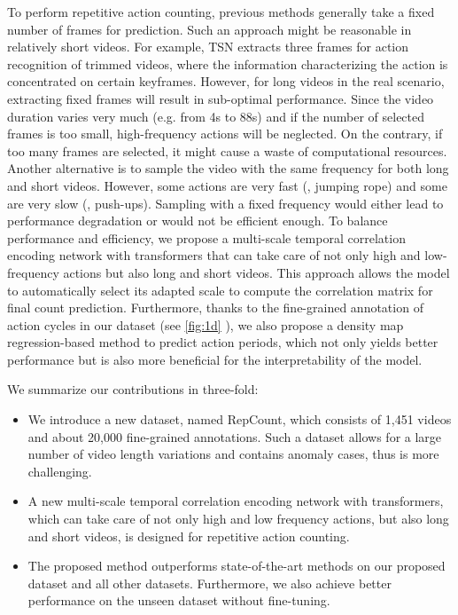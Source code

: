 \documentclass[10pt,twocolumn,letterpaper]{article}
\begin{document}
To perform repetitive action counting, previous methods \cite{RepNet} generally take a fixed number of frames for prediction. Such an approach might be reasonable in relatively short videos. For example, TSN \cite{TSN2016ECCV} extracts three frames for action recognition of trimmed videos, where the information characterizing the action is concentrated on certain keyframes. However, for long videos in the real scenario, extracting fixed frames will result in sub-optimal performance. Since the video duration varies very much (e.g. from 4s to 88s) and if the number of selected frames is too small, high-frequency actions will be neglected. On the contrary, if too many frames are selected, it might cause a waste of computational resources. Another alternative is to sample the video with the same frequency for both long and short videos. However, some actions are very fast (\eg, jumping rope) and some are very slow (\eg, push-ups). Sampling with a fixed frequency would either lead to performance degradation or would not be efficient enough. To balance performance and efficiency, we propose a multi-scale temporal correlation encoding network with transformers that can take care of not only high and low-frequency actions but also long and short videos. This approach allows the model to automatically select its adapted scale to compute the correlation matrix for final count prediction. Furthermore, thanks to the fine-grained annotation of action cycles in our dataset (see \cref{fig:1d} ), we also propose a density map regression-based method to predict action periods, which not only yields better performance but is also more beneficial for the interpretability of the model.

We summarize our contributions in three-fold:

\begin{itemize}[leftmargin=*]
\item We introduce a new dataset, named RepCount, which consists of 1,451 videos and about 20,000 fine-grained annotations. Such a dataset allows for a large number of video length variations and contains anomaly cases, thus is more challenging. 
\item A new multi-scale temporal correlation encoding network with transformers, which can take care of not only high and low frequency actions, but also long and short videos, is designed for repetitive action counting. 
\item The proposed method outperforms state-of-the-art methods on our proposed dataset and all other datasets. Furthermore, we also achieve better performance on the unseen dataset without fine-tuning.

\end{itemize}
\end{document}
